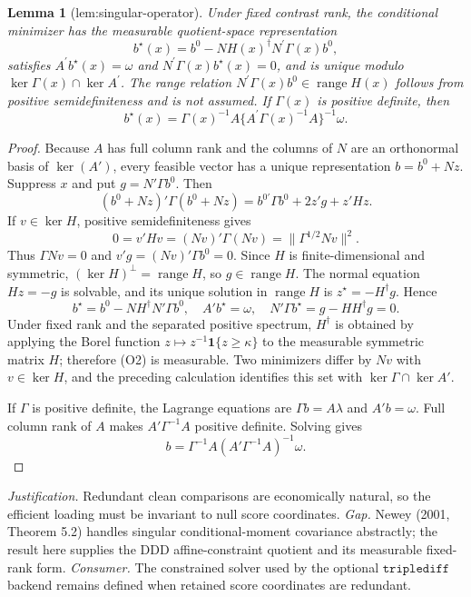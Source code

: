 \documentclass{article}
\newtheorem{lemma}{Lemma}
\begin{document}
\begin{lemma}[lem:singular-operator]\label{lem:singular-operator}
Under fixed contrast rank, the conditional minimizer has the measurable quotient-space representation \[b^{\star}(x)=b^0-NH(x)^{\dagger}N^{\prime}\Gamma(x)b^0,\] satisfies \(A^{\prime}b^{\star}(x)=\omega\) and \(N^{\prime}\Gamma(x)b^{\star}(x)=0\), and is unique modulo \(\ker\Gamma(x)\cap\ker A^{\prime}\). The range relation \(N^{\prime}\Gamma(x)b^0\in\operatorname{range}H(x)\) follows from positive semidefiniteness and is not assumed. If \(\Gamma(x)\) is positive definite, then \[b^{\star}(x)=\Gamma(x)^{-1}A\{A^{\prime}\Gamma(x)^{-1}A\}^{-1}\omega.\]
\end{lemma}
\begin{proof}
Because \(A\) has full column rank and the columns of \(N\) are an orthonormal basis of \(\ker(A')\), every feasible vector has a unique representation \(b=b^0+Nz\).  Suppress \(x\) and put \(g=N'\Gamma b^0\).  Then
\[
(b^0+Nz)'\Gamma(b^0+Nz)
=b^{0\prime}\Gamma b^0+2z'g+z'Hz.
\tag{O1}
\]
If \(v\in\ker H\), positive semidefiniteness gives
\[
0=v'Hv=(Nv)'\Gamma(Nv)=\|\Gamma^{1/2}Nv\|^2.
\]
Thus \(\Gamma Nv=0\) and \(v'g=(Nv)'\Gamma b^0=0\).  Since \(H\) is finite-dimensional and symmetric, \((\ker H)^\perp=\operatorname{range}H\), so \(g\in\operatorname{range}H\).  The normal equation \(Hz=-g\) is solvable, and its unique solution in \(\operatorname{range}H\) is \(z^\star=-H^\dagger g\).  Hence
\[
b^\star=b^0-NH^\dagger N'\Gamma b^0,
\quad A'b^\star=\omega,
\quad N'\Gamma b^\star=g-HH^\dagger g=0.
\tag{O2}
\]
Under fixed rank and the separated positive spectrum, \(H^\dagger\) is obtained by applying the Borel function \(z\mapsto z^{-1}\mathbf 1\{z\ge\kappa\}\) to the measurable symmetric matrix \(H\); therefore (O2) is measurable.  Two minimizers differ by \(Nv\) with \(v\in\ker H\), and the preceding calculation identifies this set with \(\ker\Gamma\cap\ker A'\).

If \(\Gamma\) is positive definite, the Lagrange equations are \(\Gamma b=A\lambda\) and \(A'b=\omega\).  Full column rank of \(A\) makes \(A'\Gamma^{-1}A\) positive definite.  Solving gives
\[
b=\Gamma^{-1}A(A'\Gamma^{-1}A)^{-1}\omega.
\]
\end{proof}
\par\smallskip\noindent \textit{Justification.} Redundant clean comparisons are economically natural, so the efficient loading must be invariant to null score coordinates. \textit{Gap.} Newey (2001, Theorem 5.2) handles singular conditional-moment covariance abstractly; the result here supplies the DDD affine-constraint quotient and its measurable fixed-rank form. \textit{Consumer.} The constrained solver used by the optional \(\texttt{triplediff}\) backend remains defined when retained score coordinates are redundant.
\end{document}
